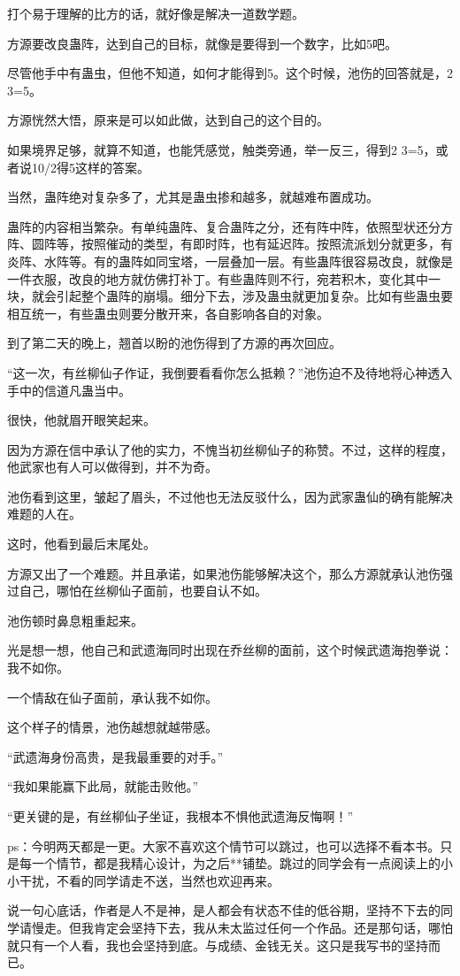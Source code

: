 \begin{this_body}
打个易于理解的比方的话，就好像是解决一道数学题。

方源要改良蛊阵，达到自己的目标，就像是要得到一个数字，比如5吧。

尽管他手中有蛊虫，但他不知道，如何才能得到5。这个时候，池伤的回答就是，2 3=5。

方源恍然大悟，原来是可以如此做，达到自己的这个目的。

如果境界足够，就算不知道，也能凭感觉，触类旁通，举一反三，得到2 3=5，或者说10/2得5这样的答案。

当然，蛊阵绝对复杂多了，尤其是蛊虫掺和越多，就越难布置成功。

蛊阵的内容相当繁杂。有单纯蛊阵、复合蛊阵之分，还有阵中阵，依照型状还分方阵、圆阵等，按照催动的类型，有即时阵，也有延迟阵。按照流派划分就更多，有炎阵、水阵等。有的蛊阵如同宝塔，一层叠加一层。有些蛊阵很容易改良，就像是一件衣服，改良的地方就仿佛打补丁。有些蛊阵则不行，宛若积木，变化其中一块，就会引起整个蛊阵的崩塌。细分下去，涉及蛊虫就更加复杂。比如有些蛊虫要相互统一，有些蛊虫则要分散开来，各自影响各自的对象。

到了第二天的晚上，翘首以盼的池伤得到了方源的再次回应。

“这一次，有丝柳仙子作证，我倒要看看你怎么抵赖？”池伤迫不及待地将心神透入手中的信道凡蛊当中。

很快，他就眉开眼笑起来。

因为方源在信中承认了他的实力，不愧当初丝柳仙子的称赞。不过，这样的程度，他武家也有人可以做得到，并不为奇。

池伤看到这里，皱起了眉头，不过他也无法反驳什么，因为武家蛊仙的确有能解决难题的人在。

这时，他看到最后末尾处。

方源又出了一个难题。并且承诺，如果池伤能够解决这个，那么方源就承认池伤强过自己，哪怕在丝柳仙子面前，也要自认不如。

池伤顿时鼻息粗重起来。

光是想一想，他自己和武遗海同时出现在乔丝柳的面前，这个时候武遗海抱拳说：我不如你。

一个情敌在仙子面前，承认我不如你。

这个样子的情景，池伤越想就越带感。

“武遗海身份高贵，是我最重要的对手。”

“我如果能赢下此局，就能击败他。”

“更关键的是，有丝柳仙子坐证，我根本不惧他武遗海反悔啊！”

ps：今明两天都是一更。大家不喜欢这个情节可以跳过，也可以选择不看本书。只是每一个情节，都是我精心设计，为之后**铺垫。跳过的同学会有一点阅读上的小小干扰，不看的同学请走不送，当然也欢迎再来。

说一句心底话，作者是人不是神，是人都会有状态不佳的低谷期，坚持不下去的同学请慢走。但我肯定会坚持下去，我从未太监过任何一个作品。还是那句话，哪怕就只有一个人看，我也会坚持到底。与成绩、金钱无关。这只是我写书的坚持而已。

\end{this_body}

